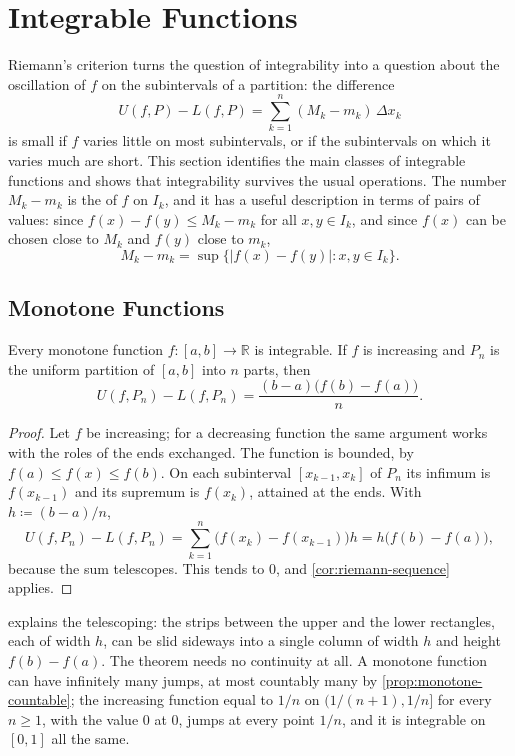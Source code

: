 \section{Integrable Functions}
\label{sec:integrable-functions}

Riemann's criterion turns the question of integrability into a question about the oscillation of $f$ on the subintervals of a partition: the difference
\[
U(f,P)-L(f,P)=\sum_{k=1}^n(M_k-m_k)\,\Delta x_k
\]
is small if $f$ varies little on most subintervals, or if the subintervals on which it varies much are short. This section identifies the main classes of integrable functions and shows that integrability survives the usual operations. The number $M_k-m_k$ is the  of $f$ on $I_k$, and it has a useful description in terms of pairs of values: since $f(x)-f(y)\le M_k-m_k$ for all $x,y\in I_k$, and since $f(x)$ can be chosen close to $M_k$ and $f(y)$ close to $m_k$,
\begin{equation}
M_k-m_k=\sup\bigl\{|f(x)-f(y)|: x,y\in I_k\bigr\}.
\label{eq:oscillation}
\end{equation}

\subsection{Monotone Functions}

\begin{theorem}
\label{thm:monotone-integrable}
Every monotone function $f\colon[a,b]\to\mathbb R$ is integrable. If $f$ is increasing and $P_n$ is the uniform partition of $[a,b]$ into $n$ parts, then
\[
U(f,P_n)-L(f,P_n)=\frac{(b-a)\bigl(f(b)-f(a)\bigr)}n .
\]
\end{theorem}

\begin{proof}
Let $f$ be increasing; for a decreasing function the same argument works with the roles of the ends exchanged. The function is bounded, by $f(a)\le f(x)\le f(b)$. On each subinterval $[x_{k-1},x_k]$ of $P_n$ its infimum is $f(x_{k-1})$ and its supremum is $f(x_k)$, attained at the ends. With $h\coloneqq(b-a)/n$,
\[
U(f,P_n)-L(f,P_n)=\sum_{k=1}^n\bigl(f(x_k)-f(x_{k-1})\bigr)h=h\bigl(f(b)-f(a)\bigr),
\]
because the sum telescopes. This tends to $0$, and \cref{cor:riemann-sequence} applies.
\end{proof}

 explains the telescoping: the strips between the upper and the lower rectangles, each of width $h$, can be slid sideways into a single column of width $h$ and height $f(b)-f(a)$. The theorem needs no continuity at all. A monotone function can have infinitely many jumps, at most countably many by \cref{prop:monotone-countable}; the increasing function equal to $1/n$ on $(1/(n+1),1/n]$ for every $n\ge1$, with the value $0$ at $0$, jumps at every point $1/n$, and it is integrable on $[0,1]$ all the same.


